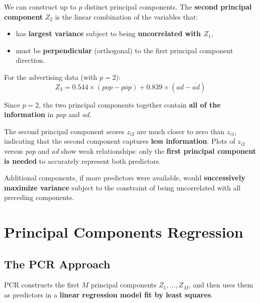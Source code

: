 \documentclass[11pt,a4paper]{article}
\theoremstyle{definition}
\theoremstyle{plain}
\theoremstyle{remark}
\begin{document}
We can construct up to $p$ distinct principal components. The \textbf{second principal component} $Z_2$ is the linear combination of the variables that:
\begin{itemize}
    \item has \textbf{largest variance} subject to being \textbf{uncorrelated with $Z_1$},
    \item must be \textbf{perpendicular} (orthogonal) to the first principal component direction.
\end{itemize}

For the advertising data (with $p = 2$):
\[
    Z_2 = 0.544 \times (\mathit{pop} - \overline{\mathit{pop}}) + 0.839 \times (\mathit{ad} - \overline{\mathit{ad}})
\]

Since $p = 2$, the two principal components together contain \textbf{all of the information} in \textit{pop} and \textit{ad}.

\begin{tcolorbox}[colback=orange!5!white,colframe=orange!75!black,title=\textbf{Key Observation}]
The second principal component scores $z_{i2}$ are much closer to zero than $z_{i1}$, indicating that the second component captures \textbf{less information}. Plots of $z_{i2}$ versus \textit{pop} and \textit{ad} show weak relationships: only the \textbf{first principal component is needed} to accurately represent both predictors.
\end{tcolorbox}

Additional components, if more predictors were available, would \textbf{successively maximize variance} subject to the constraint of being uncorrelated with all preceding components.

\section{Principal Components Regression}

\subsection{The PCR Approach}

\begin{tcolorbox}[colback=blue!5!white,colframe=blue!75!black,title=\textbf{Principal Components Regression (PCR)}]
PCR constructs the first $M$ principal components $Z_1, \ldots, Z_M$, and then uses them as predictors in a \textbf{linear regression model fit by least squares}.
\end{tcolorbox}
\end{document}
